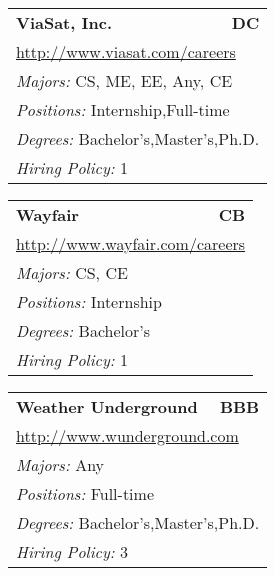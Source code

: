 \documentclass[twoside]{article}
\begin{document}
\begin{center}
\begin{multicols}{3}
\begin{FlushLeft}
\begin{minipage}{\columnwidth}
\end{minipage}
 
\begin{minipage}{\columnwidth}\begin{tabularx}{.95\columnwidth}{Xr}
                 {\Large\bf ViaSat, Inc.} & {\Large\bf DC}\\
    \multicolumn{2}{p{.95\columnwidth}}{\url{http://www.viasat.com/careers}}\\
    \multicolumn{2}{p{.95\columnwidth}}{\emph{Majors:} CS, ME, EE, Any, CE}\\
    \multicolumn{2}{p{.95\columnwidth}}{\emph{Positions:} Internship,Full-time}\\
    \multicolumn{2}{p{.95\columnwidth}}{\emph{Degrees:} Bachelor's,Master's,Ph.D.}\\
    \multicolumn{2}{p{.95\columnwidth}}{\emph{Hiring Policy:} 1}\\
    \end{tabularx}
    
\end{minipage}
 
\begin{minipage}{\columnwidth}\begin{tabularx}{.95\columnwidth}{Xr}
                 {\Large\bf Wayfair} & {\Large\bf CB}\\
    \multicolumn{2}{p{.95\columnwidth}}{\url{http://www.wayfair.com/careers}}\\
    \multicolumn{2}{p{.95\columnwidth}}{\emph{Majors:} CS, CE}\\
    \multicolumn{2}{p{.95\columnwidth}}{\emph{Positions:} Internship}\\
    \multicolumn{2}{p{.95\columnwidth}}{\emph{Degrees:} Bachelor's}\\
    \multicolumn{2}{p{.95\columnwidth}}{\emph{Hiring Policy:} 1}\\
    \end{tabularx}
    
\end{minipage}
 
\begin{minipage}{\columnwidth}\begin{tabularx}{.95\columnwidth}{Xr}
                 {\Large\bf Weather Underground} & {\Large\bf BBB}\\
    \multicolumn{2}{p{.95\columnwidth}}{\url{http://www.wunderground.com}}\\
    \multicolumn{2}{p{.95\columnwidth}}{\emph{Majors:} Any}\\
    \multicolumn{2}{p{.95\columnwidth}}{\emph{Positions:} Full-time}\\
    \multicolumn{2}{p{.95\columnwidth}}{\emph{Degrees:} Bachelor's,Master's,Ph.D.}\\
    \multicolumn{2}{p{.95\columnwidth}}{\emph{Hiring Policy:} 3}\\
    \end{tabularx}
    

\end{minipage}
\end{FlushLeft}
\end{multicols}
\end{center}
\end{document}

